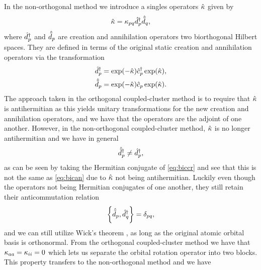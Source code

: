             In the non-orthogonal method we introduce a singles operators
            $\hat{\kappa}$ given by
            \begin{align}
                \hat{\kappa} = \kappa_{pq}\hat{d}^{\dagger}_{p}\hat{\tilde{d}}_{q},
            \end{align}
            where $\hat{d}^{\dagger}_{p}$ and $\hat{\tilde{d}}_{p}$ are creation and annihilation
            operators two biorthogonal Hilbert spaces.
            They are defined in terms of the original static creation and
            annihilation operators via the transformation
            \cite{helgaker-molecular, rolf-nocc}
            \begin{gather}
                \hat{d}^{\dagger}_{p}
                = \exp(-\hat{\kappa})\hat{c}_{p}^{\dagger}\exp(\hat{\kappa}),
                \label{eq:biccr}
                \\
                \hat{\tilde{d}}_{p}
                = \exp(-\hat{\kappa})\hat{c}_{p}\exp(\hat{\kappa}).
                \label{eq:bican}
            \end{gather}
            The approach taken in the orthogonal coupled-cluster method is to
            require that $\hat{\kappa}$ is antihermitian as this yields unitary
            transformations for the new creation and annihilation operators, and
            we have that the operators are the adjoint of one another.
            However, in the non-orthogonal coupled-cluster method, $\hat{\kappa}$ is no
            longer antihermitian and we have in general
            \begin{align}
                \hat{\tilde{d}}_{p}^{\dagger} \neq \hat{d}^{\dagger}_{p},
            \end{align}
            as can be seen by taking the Hermitian conjugate of
            \autoref{eq:biccr} and see that this is not the same as
            \autoref{eq:bican} due to $\hat{\kappa}$ not being antihermitian.
            Luckily even though the operators not being Hermitian conjugates of
            one another, they still retain their anticommutation relation
            \cite{balian1969, lowdin-bi}
            \begin{align}
                \left\{\hat{\tilde{d}}_{p}, \hat{d}^{\dagger}_{q}\right\} = \delta_{pq},
            \end{align}
            and we can still utilize Wick's theorem \cite{rolf-nocc,
            kvaal2012ab}, as long as the original atomic orbital basis is
            orthonormal.
            From the orthogonal coupled-cluster method we have that
            $\kappa_{aa} = \kappa_{ii} = 0$ which lets us separate the
            orbital rotation operator into two blocks.
            This property transfers to the non-orthogonal method and we have
